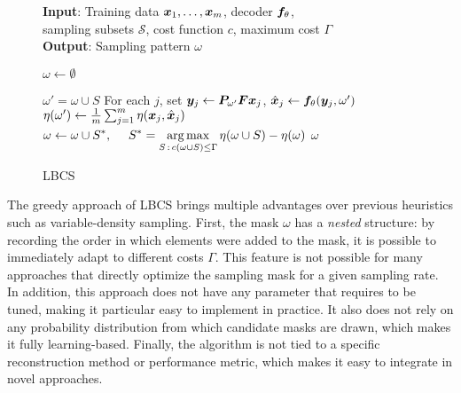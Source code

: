 \begin{figure}[!ht]
    \centering
    \begin{minipage}[b]{.7\textwidth}
    \begin{algorithm}[H]
        \caption{LBCS}\label{alg:lbcs}
        \textbf{Input}: Training data ${\bm{x}}_1, \dotsc, {\bm{x}}_m$, decoder ${\bm{f}}_\theta$,\\ sampling subsets $\mathcal{S}$, cost function $c$, maximum cost $\Gamma$ \\
        \textbf{Output}: Sampling pattern $\omega$
        \begin{algorithmic}[1]
            \State $\omega \leftarrow \emptyset$
            
                    \State $\omega' = \omega \cup S$
                    \State For each $j$, set  ${\bm{y}}_{j} \leftarrow {\bm{P}}_{\omega'}{\bm{F}}{\bm{x}}_j$, $\hat{{\bm{x}}}_j \leftarrow {\bm{f}}_\theta({\bm{y}}_j,\omega')$ 
                    \State $\eta(\omega') \leftarrow \frac{1}{m}\sum_{j=1}^m \eta({\bm{x}}_j,\hat{{\bm{x}}}_j)$
                \EndFor
                \State $\displaystyle  \omega \leftarrow \omega \cup S^*, \mbox{ ~~~}
                S^* = \operatorname*{arg\,max}_{S\,:\,c(\omega \cup S) \le \Gamma} \eta(\omega \cup S) - \eta(\omega)$
            \EndWhile
             $\omega$
        \end{algorithmic}
    \end{algorithm}
\end{minipage}
\end{figure}

The greedy approach of LBCS brings multiple advantages over previous heuristics such as variable-density sampling. First, the mask $\omega$ has a \textit{nested} structure: by recording the order in which elements were added to the mask, it is possible to immediately adapt to different costs $\Gamma$. This feature is not possible for many approaches that directly optimize the sampling mask for a given sampling rate. In addition, this approach does not have any parameter that requires to be tuned, making it particular easy to implement in practice. It also does not rely on any probability distribution from which candidate masks are drawn, which makes it fully learning-based. Finally, the algorithm is not tied to a specific reconstruction method or performance metric, which makes it easy to integrate in novel approaches. 

